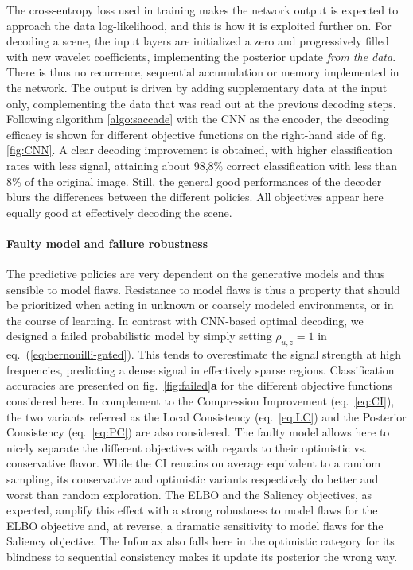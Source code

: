 \documentclass[12pt,twoside,openright]{article}
\begin{document}
The cross-entropy loss used in training makes the network output is expected to approach the data log-likelihood, and this is how it is exploited further on. For decoding a scene, the input layers are initialized a zero  and progressively filled with new wavelet coefficients, implementing the posterior update \emph{from the data}. There is thus no recurrence, sequential accumulation or memory implemented in the network. The output is driven by adding supplementary data at the input only, complementing the data that was read out at the previous decoding steps. 
Following algorithm \ref{algo:saccade} with the CNN as the encoder, the decoding efficacy is shown for different objective functions on the right-hand side of fig.\ref{fig:CNN}. A clear decoding improvement is obtained, with higher classification rates with less signal, attaining about 98,8\% correct classification with less than 8\% of the original image. Still, the general good performances of the decoder blurs the differences between the different policies. All objectives appear here equally good at effectively decoding the scene. 

\paragraph{Faulty model and failure robustness}
The predictive policies are very dependent on the generative models and thus sensible to model flaws. Resistance to model flaws is thus a property that should be prioritized when acting in unknown or coarsely modeled environments, or in the course of learning. In contrast with CNN-based optimal decoding, we designed a failed probabilistic model by simply setting $\rho_{u,z} = 1$ in eq.~(\ref{eq:bernouilli-gated}).  This tends to overestimate the signal strength at high frequencies, predicting a dense signal in effectively sparse regions. Classification accuracies are presented on fig.~\ref{fig:failed}\textbf{a} for the different objective functions considered here. In complement to the Compression Improvement (eq.~\ref{eq:CI}), the two variants referred as the Local Consistency (eq.~\ref{eq:LC}) and the Posterior Consistency (eq.~\ref{eq:PC}) are also considered. The faulty model allows here to nicely separate the different objectives with regards to their optimistic vs. conservative flavor. While the CI remains on average equivalent to a random sampling, its conservative and optimistic variants respectively do better and worst than random exploration. The ELBO and the Saliency objectives, as expected, amplify this effect with a strong robustness to model flaws for the ELBO objective and, at reverse, a dramatic sensitivity  to model flaws for the 	Saliency objective. The Infomax also falls here in the optimistic category for its blindness to sequential consistency makes it update its posterior the wrong way.
\end{document}

